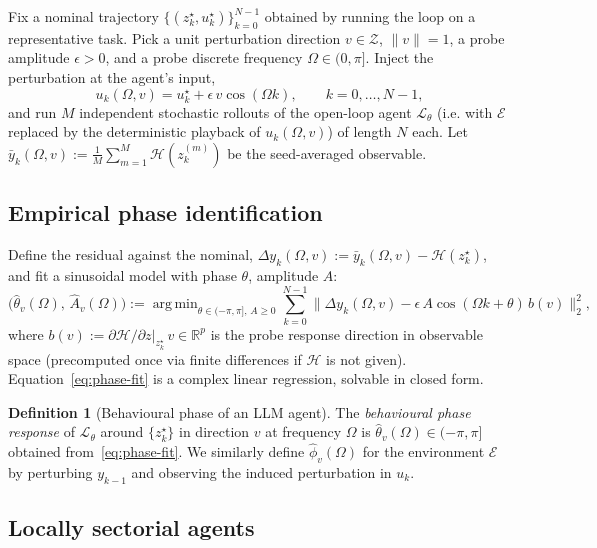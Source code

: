 \documentclass[11pt,a4paper]{article}
\theoremstyle{definition}
\newtheorem{definition}[theorem]{Definition}
\theoremstyle{remark}
\newcommand{\R}{\mathbb{R}}
\newcommand{\embspace}{\mathcal{Z}}
\newcommand{\agent}{\mathcal{L}_{\theta}}
\newcommand{\env}{\mathcal{E}}
\newcommand{\obs}{\mathcal{H}}
\DeclareMathOperator*{\argmin}{arg\,min}
\begin{document}
Fix a nominal trajectory
$\{(z_{k}^{\star},u_{k}^{\star})\}_{k=0}^{N-1}$ obtained by running the
loop on a representative task.  Pick a unit perturbation direction
$v\in\embspace$, $\|v\|=1$, a probe amplitude $\epsilon>0$, and a probe
discrete frequency $\Omega\in(0,\pi]$.  Inject the perturbation at the
agent's input,
\begin{equation}\label{eq:probe-input}
u_{k}(\Omega,v) = u_{k}^{\star} + \epsilon\,v\cos(\Omega k),\qquad k=0,\dots,N-1,
\end{equation}
and run $M$ independent stochastic rollouts of the open-loop agent
$\agent$ (i.e. with $\env$ replaced by the deterministic playback of
$u_{k}(\Omega,v)$) of length $N$ each.  Let
$\bar y_{k}(\Omega,v) := \frac{1}{M}\sum_{m=1}^{M}\obs(z_{k}^{(m)})$ be
the seed-averaged observable.

\subsection{Empirical phase identification}\label{ssec:phase-id}

Define the residual against the nominal,
$\Delta y_{k}(\Omega,v) := \bar y_{k}(\Omega,v) - \obs(z_{k}^{\star})$, and
fit a sinusoidal model with phase $\theta$, amplitude $A$:
\begin{equation}\label{eq:phase-fit}
\bigl(\widehat\theta_{v}(\Omega),\,\widehat A_{v}(\Omega)\bigr)
:= \argmin_{\theta\in(-\pi,\pi],\,A\ge 0}
   \sum_{k=0}^{N-1}\Big\|\Delta y_{k}(\Omega,v) - \epsilon\,A\cos(\Omega k+\theta)\,b(v)\Big\|_{2}^{2},
\end{equation}
where $b(v):=\partial\obs/\partial z\big|_{z_{k}^{\star}}\,v\in\R^{p}$ is
the probe response direction in observable space (precomputed once via
finite differences if $\obs$ is not given).  Equation~\eqref{eq:phase-fit}
is a complex linear regression, solvable in closed form.

\begin{definition}[Behavioural phase of an LLM agent]\label{def:phase}
The \emph{behavioural phase response} of $\agent$ around
$\{z_{k}^{\star}\}$ in direction $v$ at frequency $\Omega$ is
$\widehat\theta_{v}(\Omega)\in(-\pi,\pi]$ obtained
from~\eqref{eq:phase-fit}.  We similarly define
$\widehat\phi_{v}(\Omega)$ for the environment $\env$ by perturbing
$y_{k-1}$ and observing the induced perturbation in $u_{k}$.
\end{definition}

\subsection{Locally sectorial agents}\label{ssec:locally-sectorial}
\end{document}
